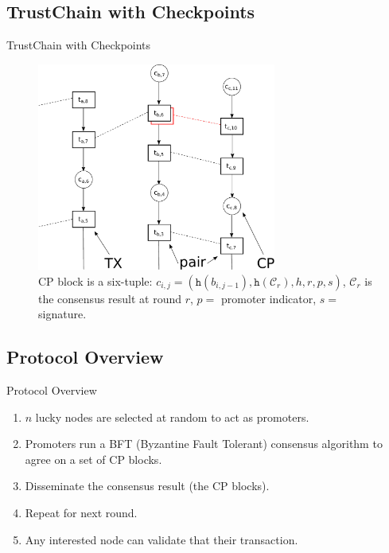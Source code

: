 \documentclass{beamer}
\begin{document}
\subsection{TrustChain with Checkpoints}
\begin{frame}{TrustChain with Checkpoints}

  \begin{figure}[h]
  \includegraphics[width=0.7\textwidth]{trustchain-bad-cp}
  \centering
  \caption{CP block is a six-tuple: $c_{i,j} = (\texttt{h}(b_{i,j-1}),
    \texttt{h}(\mathcal{C}_r), h, r, p, s)$, $\mathcal{C}_r$ is the consensus
    result at round $r$, $p =$ promoter indicator, $s =$ signature.}
  \end{figure}

\end{frame}

\subsection{Protocol Overview}
\begin{frame}{Protocol Overview}
  \begin{enumerate}
    \item $n$ lucky nodes are selected at random to act as promoters.
    \item Promoters run a BFT (Byzantine Fault Tolerant) consensus algorithm to
      agree on a set of CP blocks.
    \item Disseminate the consensus result (the CP blocks).
    \item Repeat for next round.
    \item Any interested node can validate that their transaction.
  \end{enumerate}
\end{frame}
\end{document}
